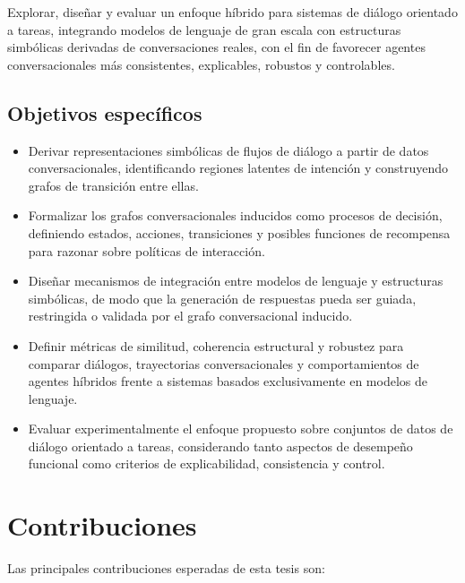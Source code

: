 Explorar, diseñar y evaluar un enfoque híbrido para sistemas de diálogo orientado a
tareas, integrando modelos de lenguaje de gran escala con estructuras simbólicas
derivadas de conversaciones reales, con el fin de favorecer agentes conversacionales
más consistentes, explicables, robustos y controlables.

\subsection{Objetivos específicos}

\begin{itemize}
\item Derivar representaciones simbólicas de flujos de diálogo a partir de datos
conversacionales, identificando regiones latentes de intención y construyendo grafos
de transición entre ellas.

\item Formalizar los grafos conversacionales inducidos como procesos de decisión,
definiendo estados, acciones, transiciones y posibles funciones de recompensa para
razonar sobre políticas de interacción.

\item Diseñar mecanismos de integración entre modelos de lenguaje y estructuras
simbólicas, de modo que la generación de respuestas pueda ser guiada, restringida
o validada por el grafo conversacional inducido.

\item Definir métricas de similitud, coherencia estructural y robustez para comparar
diálogos, trayectorias conversacionales y comportamientos de agentes híbridos frente
a sistemas basados exclusivamente en modelos de lenguaje.

\item Evaluar experimentalmente el enfoque propuesto sobre conjuntos de datos de
diálogo orientado a tareas, considerando tanto aspectos de desempeño funcional como
criterios de explicabilidad, consistencia y control.
\end{itemize}

\section{Contribuciones}

Las principales contribuciones esperadas de esta tesis son:

